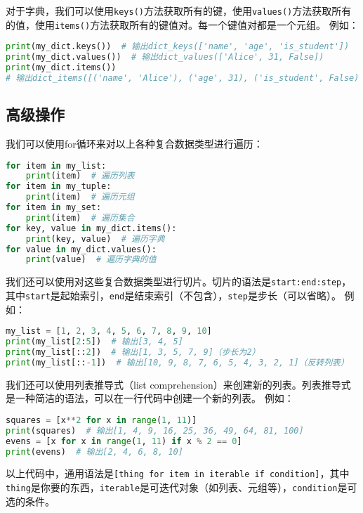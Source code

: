 \documentclass[../main.tex]{subfiles}
\begin{document}
对于字典，我们可以使用\texttt{keys()}方法获取所有的键，使用\texttt{values()}方法获取所有的值，使用\texttt{items()}方法获取所有的键值对。每一个键值对都是一个元组。
例如：

\begin{lstlisting}[language=python]
print(my_dict.keys())  # 输出dict_keys(['name', 'age', 'is_student'])
print(my_dict.values())  # 输出dict_values(['Alice', 31, False])
print(my_dict.items())
# 输出dict_items([('name', 'Alice'), ('age', 31), ('is_student', False)])
\end{lstlisting}

\subsection{高级操作}

我们可以使用for循环来对以上各种复合数据类型进行遍历：
\begin{lstlisting}[language=python]
for item in my_list:
    print(item)  # 遍历列表
for item in my_tuple:
    print(item)  # 遍历元组
for item in my_set:
    print(item)  # 遍历集合
for key, value in my_dict.items():
    print(key, value)  # 遍历字典
for value in my_dict.values():
    print(value)  # 遍历字典的值
\end{lstlisting}

我们还可以使用对这些复合数据类型进行切片。切片的语法是\texttt{start:end:step}，其中\texttt{start}是起始索引，\texttt{end}是结束索引（不包含），\texttt{step}是步长（可以省略）。
例如：
\begin{lstlisting}[language=python]
my_list = [1, 2, 3, 4, 5, 6, 7, 8, 9, 10]
print(my_list[2:5])  # 输出[3, 4, 5]
print(my_list[::2])  # 输出[1, 3, 5, 7, 9]（步长为2）
print(my_list[::-1])  # 输出[10, 9, 8, 7, 6, 5, 4, 3, 2, 1]（反转列表）
\end{lstlisting}

我们还可以使用列表推导式（list comprehension）来创建新的列表。列表推导式是一种简洁的语法，可以在一行代码中创建一个新的列表。
例如：
\begin{lstlisting}[language=python]
squares = [x**2 for x in range(1, 11)]
print(squares)  # 输出[1, 4, 9, 16, 25, 36, 49, 64, 81, 100]
evens = [x for x in range(1, 11) if x % 2 == 0]
print(evens)  # 输出[2, 4, 6, 8, 10]
\end{lstlisting}

以上代码中，通用语法是\texttt{[thing for item in iterable if condition]}，其中\texttt{thing}是你要的东西，\texttt{iterable}是可迭代对象（如列表、元组等），\texttt{condition}是可选的条件。
\end{document}
